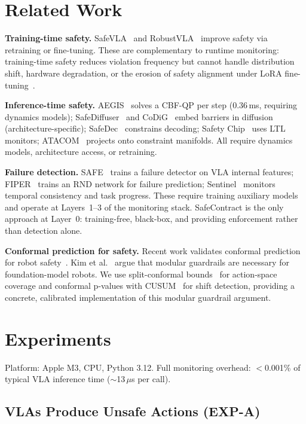 \documentclass[conference]{IEEEtran}
\begin{document}
\section{Related Work}

\textbf{Training-time safety.}
SafeVLA~\cite{safevla} and RobustVLA~\cite{robustvla} improve safety via retraining or fine-tuning.
These are complementary to runtime monitoring: training-time safety reduces violation frequency but cannot handle distribution shift, hardware degradation, or the erosion of safety alignment under LoRA fine-tuning~\cite{safevla}.

\textbf{Inference-time safety.}
AEGIS~\cite{aegis} solves a CBF-QP per step (0.36\,ms, requiring dynamics models); SafeDiffuser~\cite{safediffuser} and CoDiG~\cite{codig} embed barriers in diffusion (architecture-specific); SafeDec~\cite{safedec} constrains decoding; Safety Chip~\cite{safetychip} uses LTL monitors; ATACOM~\cite{atacom} projects onto constraint manifolds.
All require dynamics models, architecture access, or retraining.

\textbf{Failure detection.}
SAFE~\cite{safe2025} trains a failure detector on VLA internal features; FIPER~\cite{fiper2025} trains an RND network for failure prediction; Sentinel~\cite{sentinel} monitors temporal consistency and task progress.
These require training auxiliary models and operate at Layers~1--3 of the monitoring stack.
SafeContract is the only approach at Layer~0: training-free, black-box, and providing enforcement rather than detection alone.

\textbf{Conformal prediction for safety.}
Recent work validates conformal prediction for robot safety~\cite{safe2025,feldman2025}.
Kim et al.~\cite{kim2026guardrails} argue that modular guardrails are necessary for foundation-model robots.
We use split-conformal bounds~\cite{vovk2005} for action-space coverage and conformal p-values with CUSUM~\cite{page1954} for shift detection, providing a concrete, calibrated implementation of this modular guardrail argument.

\section{Experiments}

Platform: Apple M3, CPU, Python 3.12. Full monitoring overhead: $<$0.001\% of typical VLA inference time (${\sim}$13\,$\mu$s per call).

\subsection{VLAs Produce Unsafe Actions (EXP-A)}
\label{sec:exp_a}
\end{document}
